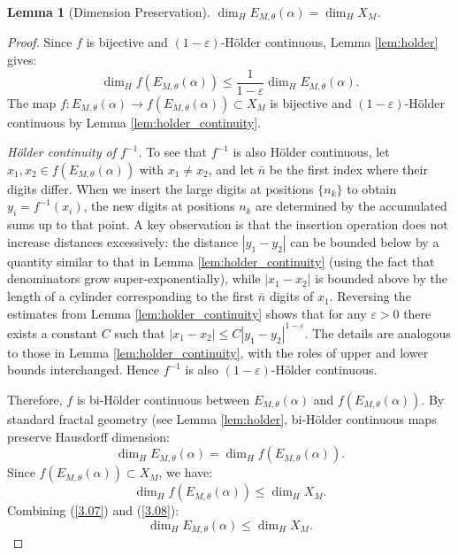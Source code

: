 \documentclass{article}
\newtheorem{lemma}[theorem]{Lemma}
\numberwithin{equation}{section}
\begin{document}
\begin{lemma}[Dimension Preservation] \label{lem:dimension_preservation}
$\dim_H E_{M,\theta}(\alpha) = \dim_H X_M$.
\end{lemma}

\begin{proof}
Since $f$ is bijective and $(1-\varepsilon)$-Hölder continuous, Lemma \ref{lem:holder} gives:
\begin{equation}
\dim_H f(E_{M,\theta}(\alpha)) \leq \frac{1}{1-\varepsilon} \dim_H E_{M,\theta}(\alpha). \label{3.06}    
\end{equation}
%
The map $f: E_{M,\theta}(\alpha) \to f(E_{M,\theta}(\alpha)) \subset X_M$ is bijective and $(1-\varepsilon)$-Hölder continuous by Lemma \ref{lem:holder_continuity}. 
%

\emph{Hölder continuity of $f^{-1}$.}  
To see that $f^{-1}$ is also Hölder continuous, let $x_1, x_2 \in f(E_{M,\theta}(\alpha))$ with $x_1 \neq x_2$, and let $\bar{n}$ be the first index where their digits differ. When we insert the large digits at positions $\{n_k\}$ to obtain $y_i = f^{-1}(x_i)$, the new digits at positions $n_k$ are determined by the accumulated sums up to that point. A key observation is that the insertion operation does not increase distances excessively: the distance $|y_1-y_2|$ can be bounded below by a quantity similar to that in Lemma \ref{lem:holder_continuity} (using the fact that denominators grow super‑exponentially), while $|x_1-x_2|$ is bounded above by the length of a cylinder corresponding to the first $\bar{n}$ digits of $x_1$. Reversing the estimates from Lemma \ref{lem:holder_continuity} shows that for any $\varepsilon>0$ there exists a constant $C$ such that $|x_1-x_2| \le C |y_1-y_2|^{1-\varepsilon}$. The details are analogous to those in Lemma \ref{lem:holder_continuity}, with the roles of upper and lower bounds interchanged. Hence $f^{-1}$ is also $(1-\varepsilon)$-Hölder continuous.

Therefore, $f$ is bi-Hölder continuous between $E_{M,\theta}(\alpha)$ and $f(E_{M,\theta}(\alpha))$. By standard fractal geometry (see Lemma \ref{lem:holder}, bi-Hölder continuous maps preserve Hausdorff dimension:
\begin{equation}
\dim_H E_{M,\theta}(\alpha) = \dim_H f(E_{M,\theta}(\alpha)). \label{3.07}
\end{equation}
%
Since $f(E_{M,\theta}(\alpha)) \subset X_M$, we have:
\begin{equation}
\dim_H f(E_{M,\theta}(\alpha)) \leq \dim_H X_M. \label{3.08}
\end{equation}
%
Combining (\ref{3.07}) and (\ref{3.08}):
\begin{equation}
\dim_H E_{M,\theta}(\alpha) \leq \dim_H X_M. \label{3.09}
\end{equation}


\end{proof}
\end{document}
